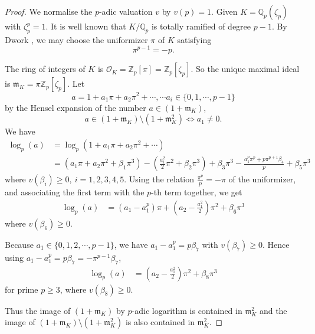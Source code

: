 \documentclass[12pt,reqno]{amsart}
\numberwithin{figure}{section}
\theoremstyle{plain}
\theoremstyle{definition}
\numberwithin{equation}{section}
\begin{document}
	\begin{proof}
    We normalise the $p$-adic valuation $v$ by $v(p)=1$. Given $K=\mathbb{Q}_p(\zeta_p)$ with $\zeta_p^p=1$. It is well known that $K/\mathbb{Q}_p$ is totally ramified of degree $p-1$. By Dwork \cite{BD}, we may choose the uniformizer $\pi$ of $K$ satisfying 
    \[\pi^{p-1}=-p.\]
    
    
	 The ring of integers of $K$ is $\mathcal{O}_K=\mathbb{Z}_p[\pi]=\mathbb{Z}_p[\zeta_p]$. So the unique maximal ideal is $\mathfrak{m}_K=\pi \mathbb{Z}_p[\zeta_p]$. Let
            \[a=1+a_1\pi+a_2 \pi^2+\cdots, \cdots a_i \in \{0, 1, \cdots, p-1\}  \]
            by the Hensel expansion of the number $a \in (1+\mathfrak{m}_K)$,
            \[ a \in (1+\mathfrak{m}_K) \setminus (1+\mathfrak{m}_K^2) \Leftrightarrow a_1 \neq 0. \]
      We have
      \begin{align*}
          \log_p(a)&=\log_p(1+a_1\pi+a_2 \pi^2+\cdots) \\
          &=(a_1 \pi+a_2 \pi^2+\beta_1 \pi^3)-(\frac{a_1^2}{2} \pi^2+\beta_2 \pi^3)+\beta_3 \pi^3-\frac{a_1^p\pi^p+p \pi^{p+1}\beta_4}{p}+\beta_5 \pi^3
      \end{align*}
      where $v(\beta_i) \geq 0,~i=1,2,3,4,5$. Using the relation $\frac{\pi^p}{p}=-\pi$ of the uniformizer, and associating the first term with the $p$-th term together, we get
      \begin{align*}
          \log_p(a)&=(a_1-a_1^p) \pi +(a_2-\frac{a_1^2}{2})\pi^2+\beta_6 \pi^3
      \end{align*}
        where $v(\beta_6) \geq 0$.

        Because $a_1 \in \{0,1,2, \cdots, p-1\}$, we have $a_1-a_1^p=p \beta_7$ with $v(\beta_7) \geq 0$. Hence using $a_1-a_1^p=p \beta_7=-\pi^{p-1} \beta_7$,
        \begin{align*}
          \log_p(a)&=(a_2-\frac{a_1^2}{2})\pi^2+\beta_8 \pi^3
      \end{align*}
      for prime $p \geq 3$, where $v(\beta_8) \geq 0$.

      Thus the image of $(1+\mathfrak{m}_K)$ by $p$-adic logarithm is contained in $\mathfrak{m}_K^2$ and the image of $(1+\mathfrak{m}_K) \setminus (1+\mathfrak{m}_K^2)$ is also contained in $\mathfrak{m}_K^2$.


\end{proof}
\end{document}
